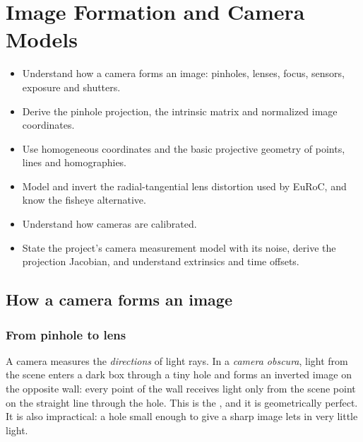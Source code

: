 \chapter{Image Formation and Camera Models}
\label{ch:camera}

\begin{objectives}
\begin{itemize}
  \item Understand how a camera forms an image: pinholes, lenses, focus, sensors, exposure and shutters.
  \item Derive the pinhole projection, the intrinsic matrix and normalized image coordinates.
  \item Use homogeneous coordinates and the basic projective geometry of points, lines and homographies.
  \item Model and invert the radial-tangential lens distortion used by EuRoC, and know the fisheye alternative.
  \item Understand how cameras are calibrated.
  \item State the project's camera measurement model with its noise, derive the projection Jacobian, and understand extrinsics and time offsets.
\end{itemize}
\end{objectives}

\section{How a camera forms an image}

\subsection{From pinhole to lens}

A camera measures the \emph{directions} of light rays. In a \emph{camera obscura}, light from the scene enters a dark box through a tiny hole and
forms an inverted image on the opposite wall: every point of the wall receives light only from the scene point on the straight line through the
hole. This is the , and it is geometrically perfect. It is also impractical: a hole small enough to give a sharp image lets in
very little light.


